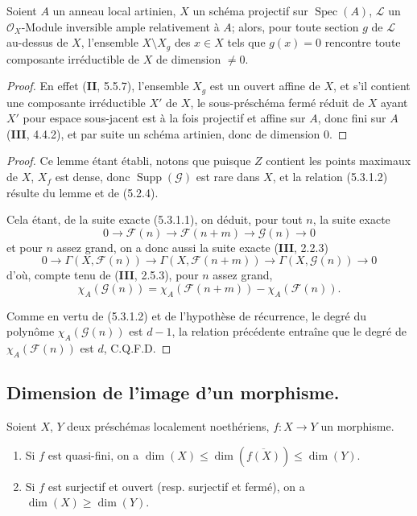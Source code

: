 \begin{lemma}[5.3.1.3]
\label{IV.2.s5.3.1.3-fr}
Soient $A$ un anneau local artinien, $X$ un schéma projectif sur
$\operatorname{Spec}(A)$, $\mathcal L$ un $\mathcal O_X$-Module inversible
ample relativement à $A$; alors, pour toute section $g$ de $\mathcal L$
au-dessus de $X$, l'ensemble $X\setminus X_g$ des $x\in X$ tels que $g(x)=0$ rencontre
toute composante irréductible de $X$ de dimension $\ne0$.
\end{lemma}

\begin{proof}
En effet (\textbf{II}, 5.5.7), l'ensemble $X_g$ est un ouvert affine de $X$, et s'il
contient une composante irréductible $X'$ de $X$, le sous-préschéma fermé
réduit de $X$ ayant $X'$ pour espace sous-jacent est à la fois projectif et
affine sur $A$, donc fini sur $A$ (\textbf{III}, 4.4.2), et par suite un schéma
artinien, donc de dimension $0$.
\end{proof}

\begin{proof}
Ce lemme étant établi, notons que puisque $Z$ contient les points maximaux de
$X$, $X_f$ est dense, donc $\operatorname{Supp}(\mathcal G)$ est rare dans
$X$, et la relation (5.3.1.2) résulte du lemme et de (5.2.4).


Cela étant, de la suite exacte (5.3.1.1), on déduit, pour tout $n$, la suite
exacte
\[
0\longrightarrow\mathcal F(n)\longrightarrow\mathcal F(n+m)
\longrightarrow\mathcal G(n)\longrightarrow0
\]
et pour $n$ assez grand, on a donc aussi la suite exacte (\textbf{III}, 2.2.3)
\[
0\longrightarrow\Gamma(X,\mathcal F(n))
\longrightarrow\Gamma(X,\mathcal F(n+m))
\longrightarrow\Gamma(X,\mathcal G(n))\longrightarrow0
\]
d'où, compte tenu de (\textbf{III}, 2.5.3), pour $n$ assez grand,
\[
\chi_A(\mathcal G(n))
=\chi_A(\mathcal F(n+m))-\chi_A(\mathcal F(n)).
\]

Comme en vertu de (5.3.1.2) et de l'hypothèse de récurrence, le degré du
polynôme $\chi_A(\mathcal G(n))$ est $d-1$, la relation précédente entraîne
que le degré de $\chi_A(\mathcal F(n))$ est $d$, C.Q.F.D.
\end{proof}

\subsection{Dimension de l'image d'un morphisme.}
\label{IV.2.s5.4-fr}

\begin{proposition}[5.4.1]
\label{IV.2.s5.4.1-fr}
Soient $X$, $Y$ deux préschémas localement noethériens, $f:X\to Y$ un
morphisme.
\begin{enumerate}
\item[\textup{(i)}] Si $f$ est quasi-fini, on a
$\dim(X)\leq\dim(\overline{f(X)})\leq\dim(Y)$.
\item[\textup{(ii)}] Si $f$ est surjectif et ouvert \textup{(resp.} surjectif et fermé\textup{)}, on a
$\dim(X)\geq\dim(Y)$.
\end{enumerate}
\end{proposition}

